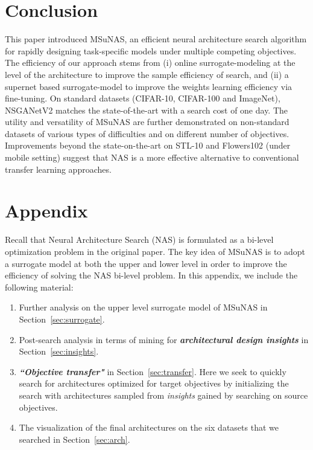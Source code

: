 \documentclass[runningheads]{llncs}
\def\ourmethod{MSuNAS}
\def\ourmodel{NSGANetV2}
\begin{document}
 \section{Conclusion}
This paper introduced \ourmethod{}, an efficient neural architecture search algorithm for rapidly designing task-specific models under multiple competing objectives. The efficiency of our approach stems from (i) online surrogate-modeling at the level of the architecture to improve the sample efficiency of search, and (ii) a supernet based surrogate-model to improve the weights learning efficiency via fine-tuning. On standard datasets (CIFAR-10, CIFAR-100 and ImageNet), \ourmodel{} matches the state-of-the-art with a search cost of one day. The utility and versatility of \ourmethod{} are further demonstrated on non-standard datasets of various types of difficulties and on different number of objectives. Improvements beyond the state-on-the-art on STL-10 and Flowers102 (under mobile setting) suggest that NAS is a more effective alternative to conventional transfer learning approaches.
 





\appendix
\section*{Appendix}
Recall that Neural Architecture Search (NAS) is formulated as a bi-level optimization problem in the original paper. The key idea of \ourmethod{} is to adopt a surrogate model at both the upper and lower level in order to improve the efficiency of solving the NAS bi-level problem. In this appendix, we include the following material:
\begin{enumerate}
\item Further analysis on the upper level surrogate model of \ourmethod{} in Section~\ref{sec:surrogate}.
\item Post-search analysis in terms of mining for \textbf{\emph{architectural design insights}} in Section~\ref{sec:insights}.
\item \textbf{\emph{``Objective transfer"}} in Section~\ref{sec:transfer}. Here we seek to quickly search for architectures optimized for target objectives by initializing the search with architectures sampled from \emph{insights} gained by searching on source objectives.
\item The visualization of the final architectures on the six datasets that we searched in Section~\ref{sec:arch}.
\end{enumerate}
\end{document}
